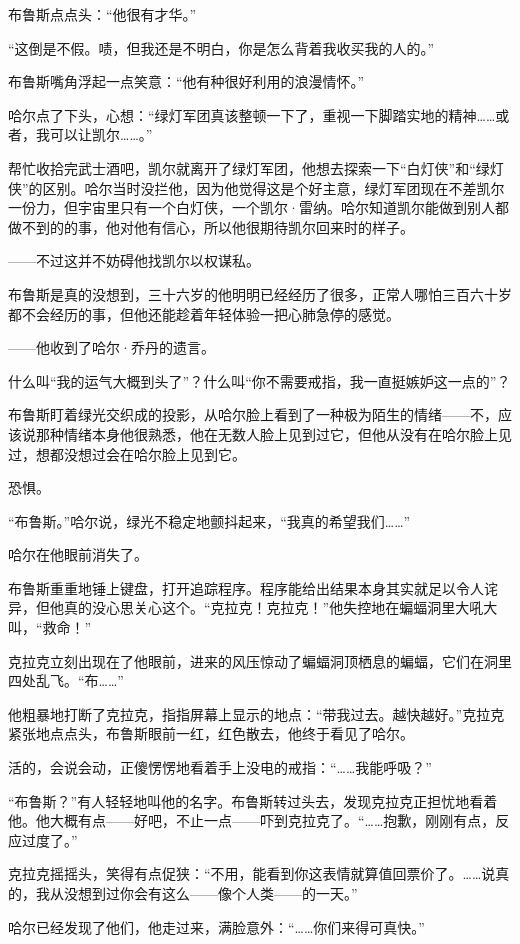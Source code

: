 \documentclass[../main]{subfiles}
\begin{document}
布鲁斯点点头：“他很有才华。”

“这倒是不假。啧，但我还是不明白，你是怎么背着我收买我的人的。”

布鲁斯嘴角浮起一点笑意：“他有种很好利用的浪漫情怀。”

哈尔点了下头，心想：“绿灯军团真该整顿一下了，重视一下脚踏实地的精神……或者，我可以让凯尔\ldots\ldots。”

帮忙收拾完武士酒吧，凯尔就离开了绿灯军团，他想去探索一下“白灯侠”和“绿灯侠”的区别。哈尔当时没拦他，因为他觉得这是个好主意，绿灯军团现在不差凯尔一份力，但宇宙里只有一个白灯侠，一个凯尔·雷纳。哈尔知道凯尔能做到别人都做不到的的事，他对他有信心，所以他很期待凯尔回来时的样子。

——不过这并不妨碍他找凯尔以权谋私。

布鲁斯是真的没想到，三十六岁的他明明已经经历了很多，正常人哪怕三百六十岁都不会经历的事，但他还能趁着年轻体验一把心肺急停的感觉。

——他收到了哈尔·乔丹的遗言。

什么叫“我的运气大概到头了”？什么叫“你不需要戒指，我一直挺嫉妒这一点的”？

布鲁斯盯着绿光交织成的投影，从哈尔脸上看到了一种极为陌生的情绪——不，应该说那种情绪本身他很熟悉，他在无数人脸上见到过它，但他从没有在哈尔脸上见过，想都没想过会在哈尔脸上见到它。

恐惧。

“布鲁斯。”哈尔说，绿光不稳定地颤抖起来，“我真的希望我们\ldots\ldots”

哈尔在他眼前消失了。

布鲁斯重重地锤上键盘，打开追踪程序。程序能给出结果本身其实就足以令人诧异，但他真的没心思关心这个。“克拉克！克拉克！”他失控地在蝙蝠洞里大吼大叫，“救命！”

克拉克立刻出现在了他眼前，进来的风压惊动了蝙蝠洞顶栖息的蝙蝠，它们在洞里四处乱飞。“布\ldots\ldots”

他粗暴地打断了克拉克，指指屏幕上显示的地点：“带我过去。越快越好。”克拉克紧张地点点头，布鲁斯眼前一红，红色散去，他终于看见了哈尔。

活的，会说会动，正傻愣愣地看着手上没电的戒指：“……我能呼吸？”

“布鲁斯？”有人轻轻地叫他的名字。布鲁斯转过头去，发现克拉克正担忧地看着他。他大概有点——好吧，不止一点——吓到克拉克了。“……抱歉，刚刚有点，反应过度了。”

克拉克摇摇头，笑得有点促狭：“不用，能看到你这表情就算值回票价了。……说真的，我从没想到过你会有这么——像个人类——的一天。”

哈尔已经发现了他们，他走过来，满脸意外：“……你们来得可真快。”
\end{document}
